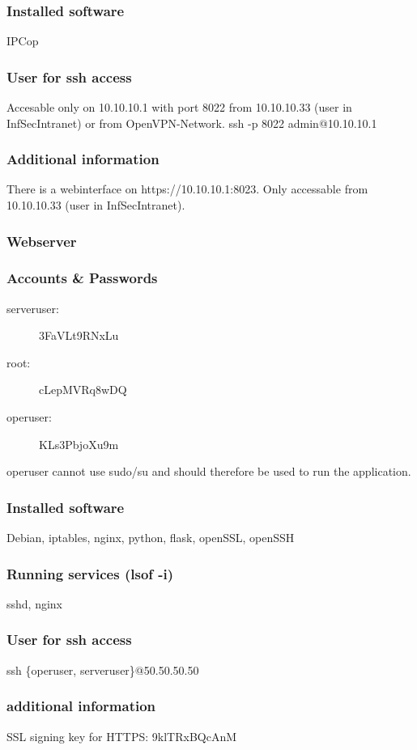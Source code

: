 \documentclass[a4paper, toc=index, 12pt, DIV14, twoside, BCOR2cm, headsepline, numbers=noenddot, bibliography=totoc]{scrbook}
\begin{document}
\subsubsection*{Installed software}
IPCop
\subsubsection*{User for ssh access}
Accesable only on 10.10.10.1 with port 8022 from 10.10.10.33 (user in InfSecIntranet) or from OpenVPN-Network.\newline
ssh -p 8022 admin@10.10.10.1
\subsubsection*{Additional information}
There is a webinterface on https://10.10.10.1:8023. Only accessable from 10.10.10.33 (user in InfSecIntranet).

\subsubsection{Webserver}
\subsubsection*{Accounts \& Passwords}
\begin{multicols}{2}
\begin{description}
\item[serveruser:] 3FaVLt9RNxLu
\item[root:] cLepMVRq8wDQ
\item[operuser:] KLs3PbjoXu9m
\end{description}
\end{multicols}
operuser cannot use sudo/su and should therefore be used to run the application.
\subsubsection*{Installed software}
Debian, iptables, nginx, python, flask, openSSL, openSSH
\subsubsection*{Running services (lsof -i)}
sshd, nginx
\subsubsection*{User for ssh access}
ssh \{operuser, serveruser\}@50.50.50.50
\subsubsection*{additional information}
SSL signing key for HTTPS: 9klTRxBQcAnM
\end{document}
